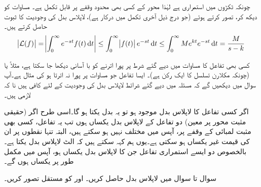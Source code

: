چونکہ  ٹکڑوں میں استمراری ہے لہٰذا  محور کے کسی بھی محدود وقفے پر  قابل تکمل ہے۔ مساوات  کو دیکھ کر،  تصور کرتے ہوئے (جو درج ذیل آخری تکمل میں درکار ہے)، لاپلاس بدل کی وجودیت کا ثبوت حاصل کرتے ہیں۔
\begin{align*}
\abs{\Laplace(f)} = \abs{\int_{0}^{\infty} e^{-st}f(t)\dif t}\le \int_{0}^{\infty} \abs{f(t)}e^{-st}\dif t\le \int_{0}^{\infty} Me^{kt}e^{-st}\dif t=\frac{M}{s-k}
\end{align*}

کسی بھی تفاعل کا مساوات  میں دیے گئے شرط پر پورا اترنے کو با آسانی دیکھا جا سکتا ہے، مثلاً  یا  (چونکہ  مکلارن تسلسل کا ایک رکن ہے)۔ ایسا تفاعل جو مساوات  پر پورا نہ اترتا ہو کی مثال  ہے۔آپ سوال  میں دیکھیں گے کہ مسئلہ  میں دیے گئے شرائط لاپلاس بدل کی وجودیت کے لئے کافی ہیں نا کہ لازمی ہیں۔

اگر کسی تفاعل کا لاپلاس بدل موجود ہو تو یہ بدل یکتا ہو گا۔اسی طرح اگر (حقیقی مثبت محور پر معین) دو تفاعل کے لاپلاس بدل یکساں ہوں تب یہ تفاعل، کسی بھی مثبت لمبائی کے وقفے پر،  آپس میں مختلف نہیں ہو سکتے ہیں، البتہ تنہا نقطوں پر ان کی قیمت غیر یکساں ہو سکتی ہے۔یوں ہم کہہ سکتے ہیں کہ الٹ لاپلاس بدل یکتا ہے۔ بالخصوص دو ایسے استمراری تفاعل جن کا لاپلاس بدل یکساں ہو، آپس میں مکمل طور پر یکساں ہوں گے۔ 

سوال  تا سوال  میں لاپلاس بدل حاصل کریں۔  اور   کو مستقل تصور کریں۔

